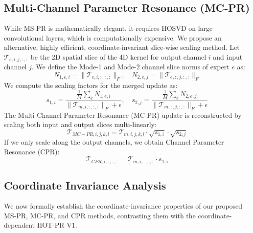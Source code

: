 \documentclass{article}
\theoremstyle{plain}
\theoremstyle{definition}
\theoremstyle{remark}
\begin{document}
\subsection{Multi-Channel Parameter Resonance (MC-PR)}
While MS-PR is mathematically elegant, it requires HOSVD on large convolutional layers, which is computationally expensive. We propose an alternative, highly efficient, coordinate-invariant slice-wise scaling method. Let $\mathcal{T}_{e, i, j, :, :}$ be the 2D spatial slice of the 4D kernel for output channel $i$ and input channel $j$. We define the Mode-1 and Mode-2 channel slice norms of expert $e$ as:
\begin{equation}
    N_{1, e, i} = \|\mathcal{T}_{e, i, :, :, :}\|_F, \quad N_{2, e, j} = \|\mathcal{T}_{e, :, j, :, :}\|_F
\end{equation}
We compute the scaling factors for the merged update as:
\begin{equation}
    s_{1, i} = \frac{\frac{1}{M}\sum_e N_{1, e, i}}{\|\mathcal{T}_{m, i, :, :, :}\|_F + \epsilon}, \quad s_{2, j} = \frac{\frac{1}{M}\sum_e N_{2, e, j}}{\|\mathcal{T}_{m, :, j, :, :}\|_F + \epsilon}
\end{equation}
The Multi-Channel Parameter Resonance (MC-PR) update is reconstructed by scaling both input and output slices multi-linearly:
\begin{equation}
    \mathcal{T}_{MC-PR, i, j, k, l} = \mathcal{T}_{m, i, j, k, l} \cdot \sqrt{s_{1, i}} \cdot \sqrt{s_{2, j}}
\end{equation}
If we only scale along the output channels, we obtain Channel Parameter Resonance (CPR):
\begin{equation}
    \mathcal{T}_{CPR, i, :, :, :} = \mathcal{T}_{m, i, :, :, :} \cdot s_{1, i}
\end{equation}

\subsection{Coordinate Invariance Analysis}
We now formally establish the coordinate-invariance properties of our proposed MS-PR, MC-PR, and CPR methods, contrasting them with the coordinate-dependent HOT-PR V1.
\end{document}
